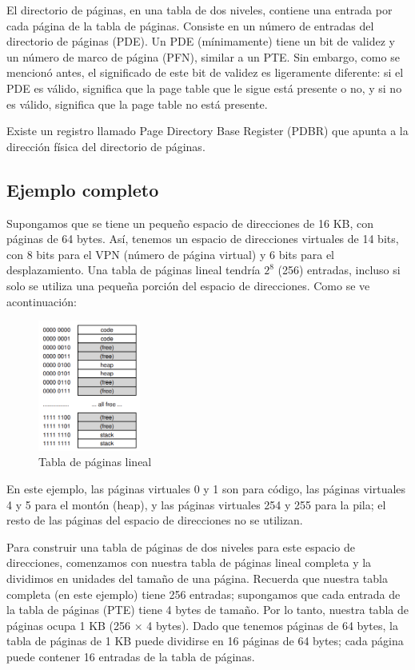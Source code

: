 \documentclass{article}
\begin{document}
El directorio de páginas, en una tabla de dos niveles, contiene una entrada por cada página de la tabla de páginas. Consiste en un número de entradas del directorio de páginas (PDE). Un PDE (mínimamente) tiene un bit de validez y un número de marco de página (PFN), similar a un PTE. Sin embargo, como se mencionó antes, el significado de este bit de validez es ligeramente diferente: si el PDE es válido, significa que la page table que le sigue está presente o no, y si no es válido, significa que la page table no está presente.

Existe un registro llamado Page Directory Base Register (PDBR) que apunta a la dirección física del directorio de páginas.

\subsection{Ejemplo completo}
Supongamos que se tiene un pequeño espacio de direcciones de 16 KB, con páginas de 64 bytes. Así, tenemos un espacio de direcciones virtuales de 14 bits, con 8 bits para el VPN (número de página virtual) y 6 bits para el desplazamiento. Una tabla de páginas lineal tendría $2^8$ (256) entradas, incluso si solo se utiliza una pequeña porción del espacio de direcciones. Como se ve acontinuación:

\begin{figure}[h]
    \centering
    \includegraphics[width=0.3\textwidth]{src/lineal.png}
    \caption{Tabla de páginas lineal}
\end{figure}

En este ejemplo, las páginas virtuales 0 y 1 son para código, las páginas virtuales 4 y 5 para el montón (heap), y las páginas virtuales 254 y 255 para la pila; el resto de las páginas del espacio de direcciones no se utilizan.

Para construir una tabla de páginas de dos niveles para este espacio de direcciones, comenzamos con nuestra tabla de páginas lineal completa y la dividimos en unidades del tamaño de una página. Recuerda que nuestra tabla completa (en este ejemplo) tiene 256 entradas; supongamos que cada entrada de la tabla de páginas (PTE) tiene 4 bytes de tamaño. Por lo tanto, nuestra tabla de páginas ocupa 1 KB (256 × 4 bytes). Dado que tenemos páginas de 64 bytes, la tabla de páginas de 1 KB puede dividirse en 16 páginas de 64 bytes; cada página puede contener 16 entradas de la tabla de páginas.
\end{document}
